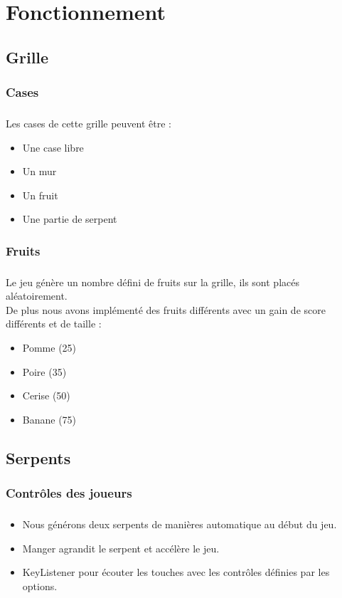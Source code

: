 \documentclass{beamer}
\begin{document}
\section{Fonctionnement}
\subsection{Grille}
\subsubsection{Cases}
\begin{frame}
\frametitle{\insertsubsubsection}
\framesubtitle{\insertsubsection}
Les cases de cette grille peuvent être :\\
\begin{itemize}
\item Une case libre
\item Un mur
\item Un fruit
\item Une partie de serpent
\end{itemize}
\end{frame}

\subsubsection{Fruits}
\begin{frame}
\frametitle{\insertsubsubsection}
\framesubtitle{\insertsubsection}
Le jeu génère un nombre défini de fruits sur la grille, ils sont placés aléatoirement.\\
De plus nous avons implémenté des fruits différents avec un gain de score différents et de taille :
\begin{itemize}
\item Pomme (25)
\item Poire (35)
\item Cerise (50)
\item Banane (75)
\end{itemize}

\end{frame}
\subsection{Serpents}
\subsubsection{Contrôles des joueurs}
\begin{frame}
\frametitle{\insertsubsubsection}
\framesubtitle{\insertsubsection}
\begin{itemize}[<+->]
\item Nous générons deux serpents de manières automatique au début du jeu.\\
\item Manger agrandit le serpent et accélère le jeu.\\
\item KeyListener pour écouter les touches avec les contrôles définies par les options.\\
\end{itemize}

\end{frame}
\end{document}
